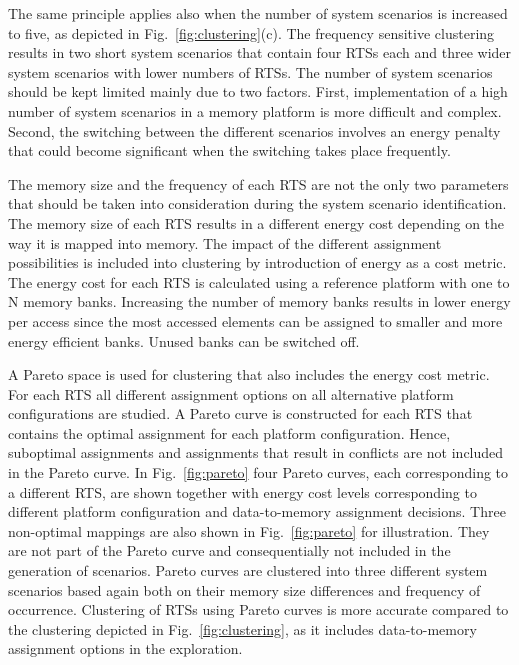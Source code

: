 \documentclass[a4paper,conference]{IEEEtran}
\begin{document}
The same principle applies also when the number of system scenarios is increased to five, as depicted in Fig.~\ref{fig:clustering}(c). The frequency sensitive clustering results in two short system scenarios that contain four RTSs each and three wider system scenarios with lower numbers of RTSs. The number of system scenarios should be kept limited mainly due to two factors. First, implementation of a high number of system scenarios in a memory platform is more difficult and complex. Second, the switching between the different scenarios involves an energy penalty that could become significant when the switching takes place frequently.

The memory size and the frequency of each RTS are not the only two parameters that should be taken into consideration during the system scenario identification. The memory size of each RTS results in a different energy cost depending on the way it is mapped into memory. The impact of the different assignment possibilities is included into clustering by introduction of energy as a cost metric. The energy cost for each RTS is calculated using a reference platform with one to N
memory banks. Increasing the number of memory banks results in lower energy per access since the most accessed elements can be assigned to smaller and more energy efficient banks. Unused banks can be switched off.

A Pareto space is used for clustering that also includes the energy cost metric. For each RTS all different assignment options on all alternative platform configurations are studied. A Pareto curve is constructed for each RTS that contains the optimal assignment for each platform configuration. Hence, suboptimal assignments and assignments that result in conflicts are not included in the Pareto curve. In Fig.~\ref{fig:pareto} four Pareto curves, each corresponding to a different RTS, are shown together with energy cost levels corresponding to different platform configuration and data-to-memory assignment decisions. Three non-optimal mappings are also shown in Fig.~\ref{fig:pareto} for illustration. They are not part of the Pareto curve and consequentially not included in the generation of scenarios. Pareto curves are clustered into three different system scenarios based again both on their memory size differences and frequency of occurrence. Clustering of RTSs using Pareto curves is more accurate compared to the clustering depicted in Fig.~\ref{fig:clustering}, as it includes data-to-memory assignment options in the exploration. 
\end{document}

